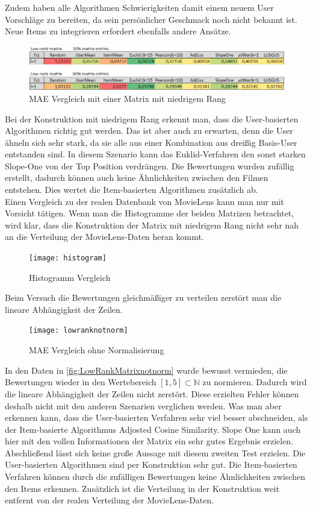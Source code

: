 Zudem haben alle Algorithmen Schwierigkeiten damit einem neuem User Vorschläge zu bereiten, da sein persönlicher Geschmack noch nicht bekannt ist. Neue Items zu integrieren erfordert ebenfalls andere Ansätze.
\begin{figure}[htbp!]
	\centering
	\includegraphics[width=1\linewidth]{bilder/lowrank}
	\caption{MAE Vergleich mit einer Matrix mit niedrigem Rang}
	\label{fig:LowRankMatrix}
\end{figure}
\FloatBarrier
Bei der Konstruktion mit niedrigem Rang erkennt man, dass die User-basierten Algorithmen richtig gut werden. Das ist aber auch zu erwarten, denn die User ähneln sich sehr stark, da sie alle aus einer Kombination aus dreißig Basis-User entstanden sind. In diesem Szenario kann das Euklid-Verfahren den sonst starken Slope-One von der Top Position verdrängen. Die Bewertungen wurden zufällig erstellt, dadurch können auch keine Ähnlichkeiten zwischen den Filmen entstehen. Dies wertet die Item-basierten Algorithmen zusätzlich ab.\\
Einen Vergleich zu der realen Datenbank von MovieLens kann man nur mit Vorsicht tätigen. Wenn man die Histogramme der beiden Matrizen betrachtet, wird klar, dass die Konstruktion der Matrix mit niedrigem Rang nicht sehr nah an die Verteilung der MovieLens-Daten heran kommt.
\begin{figure}[htbp!]
	\centering
	\texttt{[image: histogram]}
	\caption{Histogramm Vergleich}
	\label{fig:histogram}
\end{figure}
\FloatBarrier
Beim Versuch die Bewertungen gleichmäßiger zu verteilen zerstört man die lineare Abhängigkeit der Zeilen.

\begin{figure}[htbp!]
	\centering
	\texttt{[image: lowranknotnorm]}
	\caption{MAE Vergleich ohne Normalisierung}
	\label{fig:LowRankMatrixnotnorm}
\end{figure}
\FloatBarrier
In den Daten in \autoref{fig:LowRankMatrixnotnorm} wurde bewusst vermieden, die Bewertungen wieder in den Wertebereich $[1,5]\subset \mathbb{N}$ zu normieren. Dadurch wird die lineare Abhängigkeit der Zeilen nicht zerstört. Diese erzielten Fehler können deshalb nicht mit den anderen Szenarien verglichen werden. Was man aber erkennen kann, dass die User-basierten Verfahren sehr viel besser abschneiden, als der Item-basierte Algorithmus Adjosted Cosine Similarity. Slope One kann auch hier mit den vollen Informationen der Matrix ein sehr gutes Ergebnis erzielen.\\
Abschließend lässt sich keine große Aussage mit diesem zweiten Test erzielen. Die User-basierten Algorithmen sind per Konstruktion sehr gut. Die Item-basierten Verfahren können durch die zufälligen Bewertungen keine Ähnlichkeiten zwischen den Items erkennen. Zusätzlich ist die Verteilung in der Konstruktion weit entfernt von der realen Verteilung der MovieLens-Daten.

\clearpage